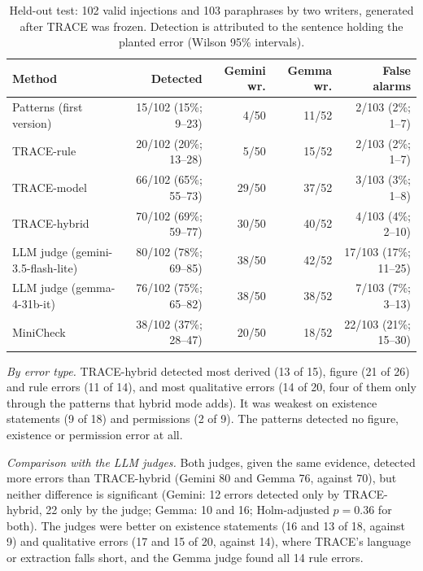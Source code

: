 \documentclass[journal]{IEEEtran}
\renewcommand{\paragraph}[1]{\par\textit{#1}\enspace}
\newcommand{\HELDOUTBASELINES}{LLM judge (gemma-4-31b-it) & 76/102 (75\%; 65--82) & 38/50 & 38/52 & 7/103 (7\%; 3--13) \\
MiniCheck & 38/102 (37\%; 28--47) & 20/50 & 18/52 & 22/103 (21\%; 15--30) \\}
\begin{document}
\begin{table}[t]
\centering\small
\caption{Held-out test: 102 valid injections and 103 paraphrases by two writers, generated after TRACE was
frozen. Detection is attributed to the sentence holding the planted error (Wilson 95\% intervals).}
\label{tab:heldout}
\setlength{\tabcolsep}{4pt}
\begin{tabular}{@{}lrrrr@{}}
\toprule
Method & Detected & Gemini wr. & Gemma wr. & False alarms \\
\midrule
Patterns (first version) & 15/102 (15\%; 9--23) & 4/50 & 11/52 & 2/103 (2\%; 1--7) \\
TRACE-rule & 20/102 (20\%; 13--28) & 5/50 & 15/52 & 2/103 (2\%; 1--7) \\
TRACE-model & 66/102 (65\%; 55--73) & 29/50 & 37/52 & 3/103 (3\%; 1--8) \\
TRACE-hybrid & 70/102 (69\%; 59--77) & 30/50 & 40/52 & 4/103 (4\%; 2--10) \\
LLM judge (gemini-3.5-flash-lite) & 80/102 (78\%; 69--85) & 38/50 & 42/52 & 17/103 (17\%; 11--25) \\
\HELDOUTBASELINES
\bottomrule
\end{tabular}
\end{table}

\paragraph{By error type.} TRACE-hybrid detected most derived (13 of 15), figure (21 of 26) and rule errors
(11 of 14), and most qualitative errors (14 of 20, four of them only through the patterns that hybrid mode
adds). It was weakest on existence statements (9 of 18) and permissions (2 of 9). The patterns detected no
figure, existence or permission error at all.

\paragraph{Comparison with the LLM judges.}
\label{sec:heldout-baselines}
Both judges, given the same evidence, detected more errors than TRACE-hybrid (Gemini 80 and Gemma 76,
against 70), but neither difference is significant (Gemini: 12 errors detected only by TRACE-hybrid, 22 only
by the judge; Gemma: 10 and 16; Holm-adjusted $p=0.36$ for both). The judges were better on existence
statements (16 and 13 of 18, against 9) and qualitative errors (17 and 15 of 20, against 14), where TRACE's
language or extraction falls short, and the Gemma judge found all 14 rule errors.
\end{document}
